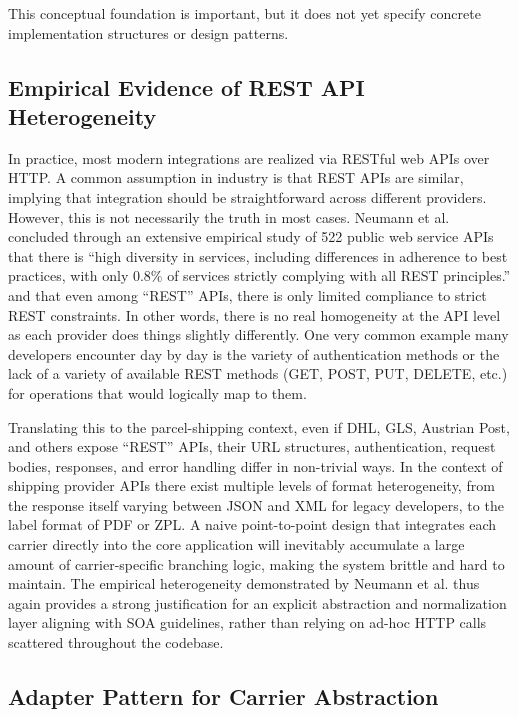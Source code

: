 \documentclass{imc-inf}
\begin{document}
This conceptual foundation is important, but it does not yet specify concrete implementation structures or design patterns.

\subsection{Empirical Evidence of REST API Heterogeneity}

In practice, most modern integrations are realized via RESTful web APIs over HTTP.
A common assumption in industry is that REST APIs are similar, implying that integration should be straightforward across different providers.
However, this is not necessarily the truth in most cases.
Neumann et al. concluded through an extensive empirical study of 522 public web service APIs that there is “high diversity in services, including differences in adherence to best practices, with only 0.8\% of services strictly complying with all REST principles.” \cite{neumannAnalysisPublicREST2021} and that even among “REST” APIs, there is only limited compliance to strict REST constraints.
In other words, there is no real homogeneity at the API level as each provider does things slightly differently.
One very common example many developers encounter day by day is the variety of authentication methods or the lack of a variety of available REST methods (GET, POST, PUT, DELETE, etc.) for operations that would logically map to them.

Translating this to the parcel-shipping context, even if DHL, GLS, Austrian Post, and others expose “REST” APIs, their URL structures, authentication, request bodies, responses, and error handling differ in non-trivial ways.
In the context of shipping provider APIs there exist multiple levels of format heterogeneity, from the response itself varying between JSON and XML for legacy developers, to the label format of PDF or ZPL.
A naive point-to-point design that integrates each carrier directly into the core application will inevitably accumulate a large amount of carrier-specific branching logic, making the system brittle and hard to maintain.
The empirical heterogeneity demonstrated by Neumann et al. thus again provides a strong justification for an explicit abstraction and normalization layer aligning with SOA guidelines, rather than relying on ad-hoc HTTP calls scattered throughout the codebase.

\subsection{Adapter Pattern for Carrier Abstraction}
\end{document}
